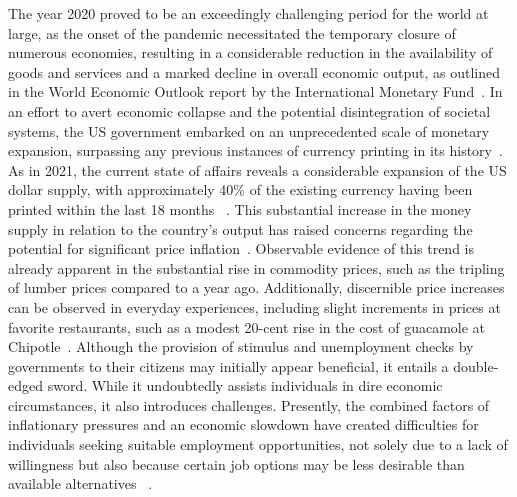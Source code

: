 The year 2020 proved to be an exceedingly challenging period for the world at large, as the onset of the pandemic necessitated
the temporary closure of numerous economies, resulting in a considerable reduction in the availability of goods and services
and a marked decline in overall economic output, as outlined in the World Economic Outlook report by the International
Monetary Fund~\cite{imf2020}. In an effort to avert economic collapse and the potential disintegration of societal systems,
the US government embarked on an unprecedented scale of monetary expansion, surpassing any previous instances of currency
printing in its history~\cite{blinder2020}. As in 2021, the current state of affairs reveals a considerable expansion of
the US dollar supply, with approximately 40\% of the existing currency having been printed within the last 18 months
~\cite{fedmoneysupply}. This substantial increase in the money supply in relation to the country's output has raised concerns
regarding the potential for significant price inflation~\cite{Blanchard2021}. Observable evidence of this trend is already
apparent in the substantial rise in commodity prices, such as the tripling of lumber prices compared to a year ago. Additionally,
discernible price increases can be observed in everyday experiences, including slight increments in prices at favorite restaurants,
such as a modest 20-cent rise in the cost of guacamole at Chipotle~\cite{BLS}. Although the provision of stimulus and unemployment
checks by governments to their citizens may initially appear beneficial, it entails a double-edged sword. While it undoubtedly
assists individuals in dire economic circumstances, it also introduces challenges. Presently, the combined factors of inflationary
pressures and an economic slowdown have created difficulties for individuals seeking suitable employment opportunities, not
solely due to a lack of willingness but also because certain job options may be less desirable than available alternatives
~\cite{cbo2020, kahn2020}.

